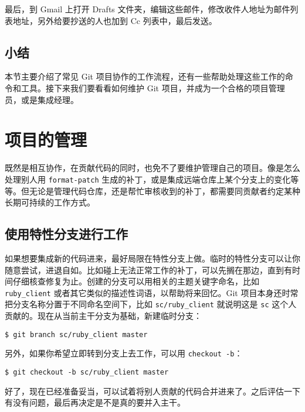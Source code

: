 \documentclass[a4paper]{book}
\begin{document}
最后，到 Gmail 上打开 Drafts 文件夹，编辑这些邮件，修改收件人地址为邮件列表地址，另外给要抄送的人也加到 Cc 列表中，最后发送。

\subsection{小结}

本节主要介绍了常见 Git 项目协作的工作流程，还有一些帮助处理这些工作的命令和工具。接下来我们要看看如何维护 Git 项目，并成为一个合格的项目管理员，或是集成经理。

\section{项目的管理}

既然是相互协作，在贡献代码的同时，也免不了要维护管理自己的项目。像是怎么处理别人用 \texttt{format-patch} 生成的补丁，或是集成远端仓库上某个分支上的变化等等。但无论是管理代码仓库，还是帮忙审核收到的补丁，都需要同贡献者约定某种长期可持续的工作方式。

\subsection{使用特性分支进行工作}

如果想要集成新的代码进来，最好局限在特性分支上做。临时的特性分支可以让你随意尝试，进退自如。比如碰上无法正常工作的补丁，可以先搁在那边，直到有时间仔细核查修复为止。创建的分支可以用相关的主题关键字命名，比如 \texttt{ruby\_client} 或者其它类似的描述性词语，以帮助将来回忆。Git 项目本身还时常把分支名称分置于不同命名空间下，比如 \texttt{sc/ruby\_client} 就说明这是 \texttt{sc} 这个人贡献的。现在从当前主干分支为基础，新建临时分支：

\begin{shaded}\begin{verbatim}
$ git branch sc/ruby_client master
\end{verbatim}\end{shaded}

另外，如果你希望立即转到分支上去工作，可以用 \texttt{checkout -b}：

\begin{shaded}\begin{verbatim}
$ git checkout -b sc/ruby_client master
\end{verbatim}\end{shaded}

好了，现在已经准备妥当，可以试着将别人贡献的代码合并进来了。之后评估一下有没有问题，最后再决定是不是真的要并入主干。
\end{document}
